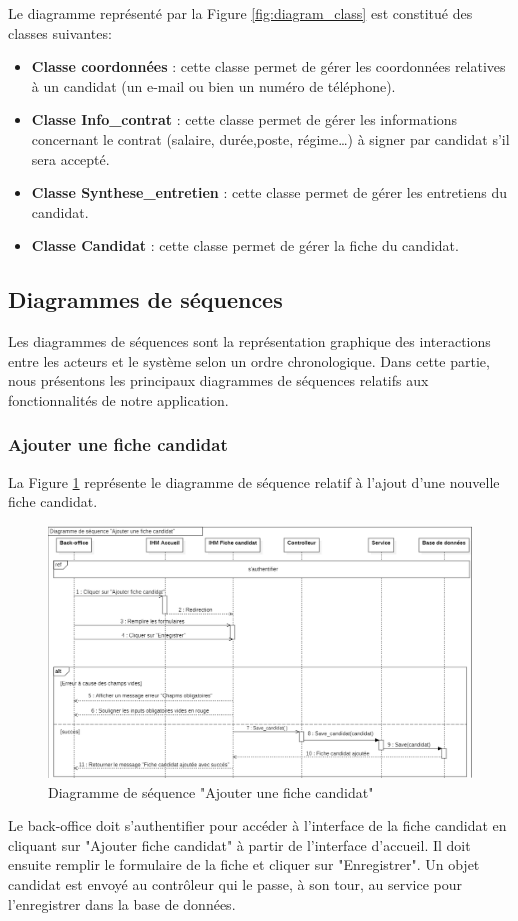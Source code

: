 \newpage
Le diagramme représenté par la Figure \ref{fig:diagram_class} est constitué des classes suivantes:
\begin{itemize}
    \item \textbf{Classe coordonnées} : cette classe permet de gérer les coordonnées relatives à un candidat (un e-mail ou bien un numéro de téléphone).
    \item \textbf{Classe Info\_contrat} : cette classe permet de gérer les informations concernant le contrat (salaire, durée,poste, régime\dots) à signer par candidat s'il sera accepté.
    \item \textbf{Classe Synthese\_entretien} : cette classe permet de gérer les entretiens du candidat.
    \item \textbf{ Classe Candidat} : cette classe permet de gérer la fiche du candidat.
    
\end{itemize}
\subsection{Diagrammes de séquences}
Les diagrammes de séquences sont la représentation graphique des interactions entre les acteurs et le système selon un ordre chronologique. Dans cette partie, nous présentons les principaux diagrammes de séquences relatifs aux fonctionnalités de notre application.
\subsubsection{Ajouter une fiche candidat}
La Figure \ref{fig:sequence_ajout_fiche} représente le diagramme de séquence relatif à l'ajout d'une nouvelle fiche candidat. 
 \begin{figure}[H]
     \centering
     \includegraphics[scale=0.51]{img/sequence ajouter fiche candidat.png}
     \caption{Diagramme de séquence "Ajouter une fiche candidat"}
     \label{fig:sequence_ajout_fiche}
 \end{figure}
 Le back-office doit s'authentifier pour accéder à l'interface de la fiche candidat en cliquant sur "Ajouter fiche candidat" à partir de l'interface d'accueil. Il doit ensuite remplir le formulaire de la fiche et cliquer sur "Enregistrer". Un objet candidat est envoyé au contrôleur qui le passe, à son tour, au service pour l'enregistrer dans la base de données.
